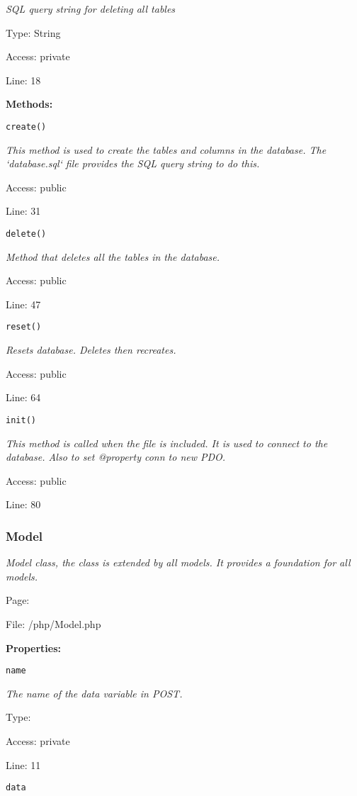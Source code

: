 {\scriptsize
\textit{SQL query string for deleting all tables}

Type: String

Access: private

Line: 18

}
\textbf{Methods:}

\texttt{create()}

{\scriptsize
\textit{This method is used to create the tables and columns in the database.
The `database.sql` file provides the SQL query string to do this.}

Access: public

Line: 31

}

\texttt{delete()}

{\scriptsize
\textit{Method that deletes all the tables in the database.}

Access: public

Line: 47

}

\texttt{reset()}

{\scriptsize
\textit{Resets database.
Deletes then recreates.}

Access: public

Line: 64

}

\texttt{init()}

{\scriptsize
\textit{This method is called when the file is included.
It is used to connect to the database.
Also to set @property conn to new PDO.}

Access: public

Line: 80

}

\subsubsection{Model}\label{Model.php.doc}
\textit{Model class, the class is extended by all models.
It provides a foundation for all models.}

Page: \pageref{Model.php}

File: /php/Model.php

\textbf{Properties:}

\texttt{name}

{\scriptsize
\textit{The name of the data variable in POST.}

Type: 

Access: private

Line: 11

}
\texttt{data}

